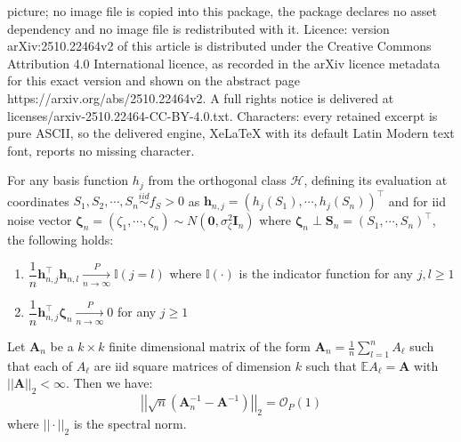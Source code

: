 \documentclass[10pt,a4paper]{amsart}
\newcommand{\E}{\mathbb{E}}
\newcommand{\bA}{\boldsymbol{A}}
\newcommand{\bI}{\boldsymbol{I}}
\newcommand{\bS}{\boldsymbol{S}}
\newcommand{\bh}{\boldsymbol{h}}
\newcommand{\bigo}{\mathcal{O}}
\newcommand{\bzero}{\boldsymbol{0}}
\newcommand{\bzet}{\boldsymbol{\zeta}}
\newcommand{\calH}{\mathcal{H}}
\newcommand{\pnlim}{\xrightarrow[n \to \infty]{P}}
\begin{document}
picture; no image file is copied into this package, the package declares no asset dependency and no image file is redistributed with it. Licence: version arXiv:2510.22464v2 of this article is distributed under the Creative Commons Attribution 4.0 International licence, as recorded in the arXiv licence metadata for this exact version and shown on the abstract page https://arxiv.org/abs/2510.22464v2. A full rights notice is delivered at licenses/arxiv-2510.22464-CC-BY-4.0.txt. Characters: every retained excerpt is pure ASCII, so the delivered engine, XeLaTeX with its default Latin Modern text font, reports no missing character.
\begin{lemma}\label{lem:dot-prod-lim}
    For any basis function $h_j$ from the orthogonal class $\calH$, defining its evaluation at coordinates $S_1, S_2,\cdots,S_n \overset{iid}{\sim} f_S>0$ as $\bh_{n,j} = (h_j(S_1), \cdots,h_j(S_n))^\top$ and for iid noise vector $\bzet_n = (\zeta_1, \cdots, \zeta_n) \sim N(\bzero,\sigma^2_\zeta\bI_n)$ where $\bzet_n \perp \bS_n = (S_1, \cdots, S_n)^\top$, the following holds:
    \begin{enumerate}
        \item\label{basis-basis-dot} $\dfrac{1}{n} \bh_{n,j}^\top\bh_{n,l} \pnlim \mathbb{I}(j = l)$ where $\mathbb{I}(\cdot)$ is the indicator function for any $j,l \geq 1$
        \item\label{basis-noise-dot} $\dfrac{1}{n} \bh_{n,j}^\top\bzet_n \pnlim 0$ for any $j \geq 1$
    \end{enumerate}
\end{lemma}

\begin{lemma}\label{prop:tight-matrix-inv}
    Let $\bA_n$ be a $k \times k$ finite dimensional matrix of the form $\bA_n = \frac{1}{n}\sum_{l=1}^n A_\ell$ such that each of $A_\ell$ are iid square matrices of dimension $k$ such that $\E A_\ell = \bA$ with $||\bA||_2<\infty$. Then we have:
$$
\left|\left|\sqrt{n}\left(\bA_n^{-1} - \bA^{-1}\right)\right|\right|_2 = \bigo_P(1)
$$
where $||\cdot||_2$ is the spectral norm.
\end{lemma}
\end{document}
